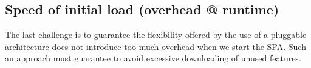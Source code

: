 \subsection{Speed of initial load (overhead @ runtime) }
The last challenge is to guarantee the flexibility offered by the use of a pluggable architecture does not introduce too much overhead when we start the SPA. Such an approach must guarantee to  avoid excessive downloading of unused features. 
